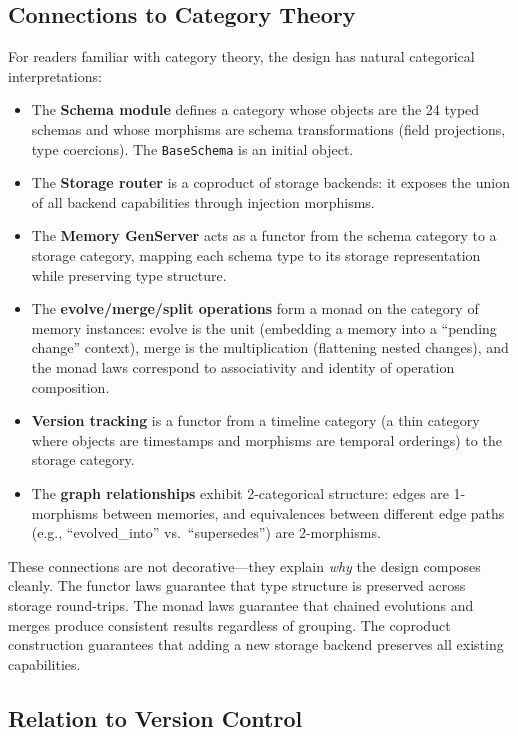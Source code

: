 \documentclass[12pt,a4paper]{article}
\theoremstyle{definition}
\begin{document}
\subsection{Connections to Category Theory}\label{subsec:cat-connections}

For readers familiar with category theory, the design has natural categorical interpretations:

\begin{itemize}
  \item The \textbf{Schema module} defines a category whose objects are the 24 typed schemas and whose morphisms are schema transformations (field projections, type coercions).
  The \texttt{BaseSchema} is an initial object.
  \item The \textbf{Storage router} is a coproduct of storage backends: it exposes the union of all backend capabilities through injection morphisms.
  \item The \textbf{Memory GenServer} acts as a functor from the schema category to a storage category, mapping each schema type to its storage representation while preserving type structure.
  \item The \textbf{evolve/merge/split operations} form a monad on the category of memory instances: evolve is the unit (embedding a memory into a ``pending change'' context), merge is the multiplication (flattening nested changes), and the monad laws correspond to associativity and identity of operation composition.
  \item \textbf{Version tracking} is a functor from a timeline category (a thin category where objects are timestamps and morphisms are temporal orderings) to the storage category.
  \item The \textbf{graph relationships} exhibit 2-categorical structure: edges are 1-morphisms between memories, and equivalences between different edge paths (e.g., ``evolved\_into'' vs.\ ``supersedes'') are 2-morphisms.
\end{itemize}

These connections are not decorative---they explain \emph{why} the design composes cleanly.
The functor laws guarantee that type structure is preserved across storage round-trips.
The monad laws guarantee that chained evolutions and merges produce consistent results regardless of grouping.
The coproduct construction guarantees that adding a new storage backend preserves all existing capabilities.

\subsection{Relation to Version Control}\label{subsec:vcs}
\end{document}

